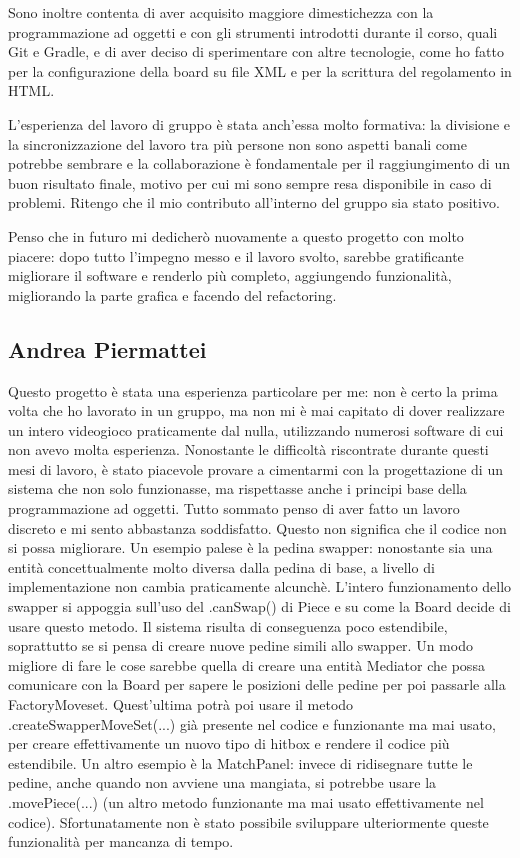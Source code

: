 \documentclass[a4paper,12pt]{report}
\begin{document}
Sono inoltre contenta di aver acquisito maggiore dimestichezza con la programmazione ad oggetti e con gli strumenti introdotti durante il corso, quali Git e Gradle, e di aver deciso di sperimentare con altre tecnologie, come ho fatto per la configurazione della board su file XML e per la scrittura del regolamento in HTML.

L'esperienza del lavoro di gruppo è stata anch'essa molto formativa: la divisione e la sincronizzazione del lavoro tra più persone non sono aspetti banali come potrebbe sembrare e la collaborazione è fondamentale per il raggiungimento di un buon risultato finale, motivo per cui mi sono sempre resa disponibile in caso di problemi. Ritengo che il mio contributo all'interno del gruppo sia stato positivo.

Penso che in futuro mi dedicherò nuovamente a questo progetto con molto piacere: dopo tutto l'impegno messo e il lavoro svolto, sarebbe gratificante migliorare il software e renderlo più completo, aggiungendo funzionalità, migliorando la parte grafica e facendo del refactoring.

\subsection{Andrea Piermattei}
Questo progetto è stata una esperienza particolare per me: non è certo la prima volta che ho lavorato in un gruppo, ma non mi è mai capitato di dover realizzare un intero videogioco praticamente dal nulla, utilizzando numerosi software di cui non avevo molta esperienza. 
Nonostante le difficoltà riscontrate durante questi mesi di lavoro, è stato piacevole provare a cimentarmi con la progettazione di un sistema che non solo funzionasse, ma rispettasse anche i principi base della programmazione ad oggetti.
Tutto sommato penso di aver fatto un lavoro discreto e mi sento abbastanza soddisfatto.
Questo non significa che il codice non si possa migliorare. Un esempio palese è la pedina swapper: nonostante sia una entità concettualmente molto diversa dalla pedina di base, a livello di implementazione non cambia praticamente alcunchè. L'intero funzionamento dello swapper si appoggia sull'uso del .canSwap() di Piece e su come la Board decide di usare questo metodo. Il sistema risulta di conseguenza poco estendibile, soprattutto se si pensa di creare nuove pedine simili allo swapper. Un modo migliore di fare le cose sarebbe quella di creare una entità Mediator che possa comunicare con la Board per sapere le posizioni delle pedine per poi passarle alla FactoryMoveset. Quest'ultima potrà poi usare il metodo .createSwapperMoveSet(...) già presente nel codice e funzionante ma mai usato, per creare effettivamente un nuovo tipo di hitbox e rendere il codice più estendibile. Un altro esempio è la MatchPanel: invece di ridisegnare tutte le pedine, anche quando non avviene una mangiata, si potrebbe usare la .movePiece(...) (un altro metodo funzionante ma mai usato effettivamente nel codice). Sfortunatamente non è stato possibile sviluppare ulteriormente queste funzionalità per mancanza di tempo.
\end{document}
